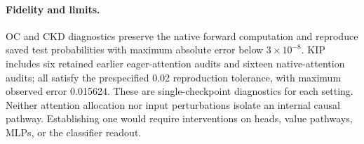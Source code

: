 \paragraph{Fidelity and limits.}
OC and CKD diagnostics preserve the native forward computation and reproduce
saved test probabilities with maximum absolute error below $3\times10^{-8}$.
KIP includes six retained earlier eager-attention audits and sixteen native-attention
audits; all satisfy the prespecified 0.02 reproduction tolerance, with maximum
observed error 0.015624. These are single-checkpoint diagnostics for each setting.
Neither attention allocation nor input perturbations isolate an internal causal
pathway. Establishing one would require interventions on heads, value pathways,
MLPs, or the classifier readout.
